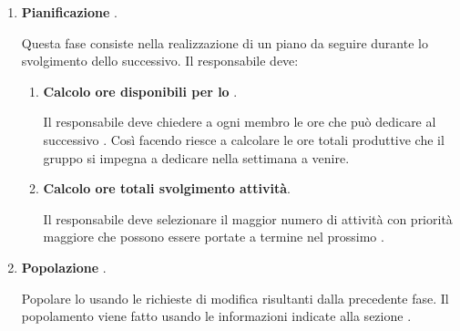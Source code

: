 \begin{enumerate}
    \item \textbf{Pianificazione }.
    
    Questa fase consiste nella realizzazione di un piano da seguire durante lo svolgimento dello  successivo.
    Il responsabile deve:
    \begin{enumerate}
        \item \textbf{Calcolo ore disponibili per lo }.
        
        Il responsabile deve chiedere a ogni  membro le ore che può dedicare al successivo .
        Così facendo riesce a calcolare le ore totali produttive che il gruppo si impegna a dedicare nella settimana a venire.

        \item \textbf{Calcolo ore totali svolgimento attività}.
        
        Il responsabile deve selezionare il maggior numero di attività con priorità maggiore che possono essere portate a termine nel prossimo .
    \end{enumerate}

    \item \textbf{Popolazione }.
    
    Popolare lo  usando le richieste di modifica risultanti dalla precedente fase.
    Il popolamento viene fatto usando le informazioni indicate alla sezione \hyperref[subpar:ITS]{}.
\end{enumerate}

